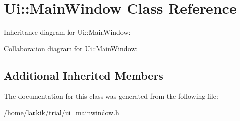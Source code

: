 \hypertarget{classUi_1_1MainWindow}{}\section{Ui\+:\+:Main\+Window Class Reference}
\label{classUi_1_1MainWindow}


Inheritance diagram for Ui\+:\+:Main\+Window\+:


Collaboration diagram for Ui\+:\+:Main\+Window\+:
\subsection*{Additional Inherited Members}


The documentation for this class was generated from the following file\+:\begin{DoxyCompactItemize}
\item 
/home/laukik/trial/ui\+\_\+mainwindow.\+h\end{DoxyCompactItemize}
